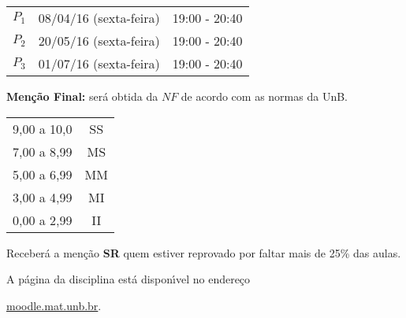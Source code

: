 \documentclass[12pt]{article}
\begin{document}
\begin{center}
    \begin{tabular}{c|c|c}
        \hline\hline
        \hspace{1cm}{\bf Prova}\hspace{1cm} & \hspace{3cm}{\bf Data}\hspace{3cm} & \hspace{1.7cm}{\bf Hor\'{a}rio}\hspace{1.7cm} \\
        \hline\hline
        $P_1$ & 08/04/16 (sexta-feira) \phantom{x} & 19:00 - 20:40 \\
        \hline
        $P_2$ & 20/05/16 (sexta-feira) \phantom{x} & 19:00 - 20:40 \\
        \hline
        $P_3$ & 01/07/16 (sexta-feira) \phantom{x} & 19:00 - 20:40 \\
        \hline\hline
    \end{tabular}
\end{center}

\vspace{0.5cm}
{\bf \noindent Men\c{c}\~{a}o Final:} ser\'{a} obtida da $NF$ de
acordo com as normas da UnB.
\begin{center}
    \begin{tabular}{c|c}
        \hline\hline
        \hspace{1cm}{Nota}\hspace{1cm} & \hspace{0.25cm}{Men\c{c}\~{a}o}\hspace{0.25cm}\\
        \hline\hline
        9,00 a 10,0 & SS \\
        \hline
        7,00 a 8,99 & MS \\
        \hline
        5,00 a 6,99 & MM \\
        \hline
        3,00 a 4,99 & MI \\
        \hline
        0,00 a 2,99  & II \\
        \hline\hline
    \end{tabular}
\end{center}
Receber{\'a} a men{\c c}{\~a}o {\bf SR} quem estiver reprovado por faltar mais de 25\%
das aulas.

\vspace{0.5cm}
 A p\'agina da disciplina est\'a dispon{\'\i}vel no endere\c{c}o
\begin{center}
    \url{moodle.mat.unb.br}.
\end{center}
\end{document}
